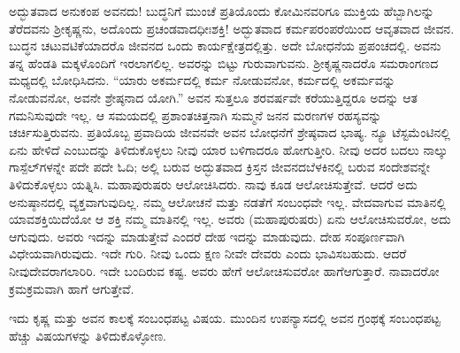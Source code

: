 ಅದ್ಭುತವಾದ ಅನುಕಂಪ ಅವನದು! ಬುದ್ಧನಿಗೆ ಮುಂಚೆ ಪ್ರತಿಯೊಂದು ಕೋಮಿನವರಿಗೂ ಮುಕ್ತಿಯ ಹೆಬ್ಬಾಗಿಲನ್ನು ತೆರೆದವನು ಶ‍್ರೀಕೃಷ್ಣನು, ಅದೊಂದು ಪ್ರಚಂಡವಾದ\break ಧೀಃಶಕ್ತಿ! ಅದ್ಭುತವಾದ ಕರ್ಮಪರಂಪರೆಯಿಂದ ಆವೃತವಾದ ಜೀವನ. ಬುದ್ಧನ ಚಟುವಟಿಕೆ\-ಯಾದರೊ ಜೀವನದ ಒಂದು ಕಾರ್ಯಕ್ಷೇತ್ರದಲ್ಲಿತ್ತು. ಅದೇ ಬೋಧನೆಯ ಪ್ರಪಂಚದಲ್ಲಿ. ಅವನು ತನ್ನ ಹೆಂಡತಿ ಮಕ್ಕಳೊಂದಿಗೆ ಇರಲಾಗಲಿಲ್ಲ. ಅವರನ್ನು ಬಿಟ್ಟು ಗುರುವಾಗುವನು. ಶ‍್ರೀಕೃಷ್ಣನಾದರೊ ಸಮರಾಂಗಣದ ಮಧ್ಯದಲ್ಲಿ ಬೋಧಿಸಿದನು. “ಯಾರು ಅಕರ್ಮದಲ್ಲಿ ಕರ್ಮ ನೋಡುವನೋ, ಕರ್ಮದಲ್ಲಿ ಅಕರ್ಮವನ್ನು ನೋಡುವನೋ, ಅವನೇ ಶ್ರೇಷ್ಠನಾದ ಯೋಗಿ.” ಅವನ ಸುತ್ತಲೂ ಶರವರ್ಷವೇ ಕರೆಯುತ್ತಿದ್ದರೂ ಅದನ್ನು ಆತ ಗಮನಿಸುವುದೇ ಇಲ್ಲ. ಆ ಸಮಯದಲ್ಲಿ ಪ್ರಶಾಂತಚಿತ್ತನಾಗಿ ಸುಮ್ಮನೆ ಜನನ ಮರಣಗಳ ರಹಸ್ಯವನ್ನು ಚರ್ಚಿಸುತ್ತಿರುವನು. ಪ್ರತಿಯೊಬ್ಬ ಪ್ರವಾದಿಯ ಜೀವನವೇ ಅವನ ಬೋಧನೆಗೆ ಶ್ರೇಷ್ಠವಾದ ಭಾಷ್ಯ. ನ್ಯೂ ಟೆಸ್ಟಮೆಂಟಿನಲ್ಲಿ ಏನು ಹೇಳಿದೆ ಎಂಬುದನ್ನು ತಿಳಿದುಕೊಳ್ಳಲು ನೀವು ಯಾರ ಬಳಿಗಾದರೂ ಹೋಗುತ್ತೀರಿ. ನೀವು ಅದರ ಬದಲು ನಾಲ್ಕು ಗಾಸ್ಪೆಲ್​ಗಳನ್ನೇ ಪದೇ ಪದೇ ಓದಿ; ಅಲ್ಲಿ ಬರುವ ಅದ್ಭುತವಾದ ಕ್ರಿಸ್ತನ ಜೀವನದ\break ಬೆಳಕಿನಲ್ಲಿ ಬರುವ ಸಂದೇಶವನ್ನೇ ತಿಳಿದುಕೊಳ್ಳಲು ಯತ್ನಿಸಿ. ಮಹಾಪುರುಷರು ಆಲೋಚಿಸಿದರು. ನಾವು ಕೂಡ ಆಲೋಚಿಸುತ್ತೇವೆ. ಆದರೆ ಅದು ಅನುಷ್ಠಾನದಲ್ಲಿ ವ್ಯಕ್ತವಾಗುವುದಿಲ್ಲ. ನಮ್ಮ ಆಲೋಚನೆ ಮತ್ತು ನಡತೆಗೆ ಸಂಬಂಧವೇ ಇಲ್ಲ. ವೇದವಾಗುವ ಮಾತಿನಲ್ಲಿ ಯಾವ\break ಶಕ್ತಿಯಿದೆಯೋ ಆ ಶಕ್ತಿ ನಮ್ಮ ಮಾತಿನಲ್ಲಿ ಇಲ್ಲ. ಅವರು (ಮಹಾಪುರುಷರು) ಏನು ಆಲೋಚಿಸುವರೋ, ಅದು ಆಗುವುದು. ಅವರು ಇದನ್ನು ಮಾಡುತ್ತೇವೆ ಎಂದರೆ ದೇಹ ಇದನ್ನು ಮಾಡುವುದು. ದೇಹ ಸಂಪೂರ್ಣವಾಗಿ ವಿಧೇಯವಾಗಿರುವುದು. ಇದೇ ಗುರಿ. ನೀವು ಒಂದು ಕ್ಷಣ ನೀವೇ ದೇವರು ಎಂದು ಭಾವಿಸಬಹುದು. ಆದರೆ ನೀವು\break ದೇವರಾಗಲಾರಿರಿ. ಇದೇ ಬಂದಿರುವ ಕಷ್ಟ. ಅವರು ಹೇಗೆ ಆಲೋಚಿಸುವರೋ ಹಾಗೆ\break ಆಗುತ್ತಾರೆ. ನಾವಾದರೋ ಕ್ರಮಕ್ರಮವಾಗಿ ಹಾಗೆ ಆಗುತ್ತೇವೆ.

ಇದು ಕೃಷ್ಣ ಮತ್ತು ಅವನ ಕಾಲಕ್ಕೆ ಸಂಬಂಧಪಟ್ಟ ವಿಷಯ. ಮುಂದಿನ ಉಪನ್ಯಾಸದಲ್ಲಿ ಅವನ ಗ್ರಂಥಕ್ಕೆ ಸಂಬಂಧಪಟ್ಟ ಹೆಚ್ಚು ವಿಷಯಗಳನ್ನು ತಿಳಿದುಕೊಳ್ಳೋಣ.

